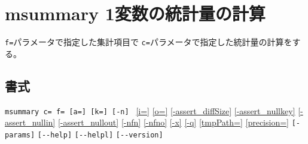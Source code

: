 
%

\section{msummary 1変数の統計量の計算\label{sect:msummary}}
\verb|f=|パラメータで指定した集計項目で
\verb|c=|パラメータで指定した統計量の計算をする。\\

\subsection*{書式}
\verb|msummary c= f= [a=] [k=] [-n] | 
\hyperref[sect:option_i]{[i=]}
\hyperref[sect:option_o]{[o=]}
\hyperref[sect:option_assert_diffSize]{[-assert\_diffSize]}
\hyperref[sect:option_assert_nullkey]{[-assert\_nullkey]}
\hyperref[sect:option_assert_nullin]{[-assert\_nullin]}
\hyperref[sect:option_assert_nullout]{[-assert\_nullout]}
\hyperref[sect:option_nfn]{[-nfn]} 
\hyperref[sect:option_nfno]{[-nfno]}  
\hyperref[sect:option_x]{[-x]}
\hyperref[sect:option_q]{[-q]}
\hyperref[sect:option_option_tmppath]{[tmpPath=]}
\hyperref[sect:option_precision]{[precision=]}
\verb|[-params]|
\verb|[--help]|
\verb|[--helpl]|
\verb|[--version]|\\

